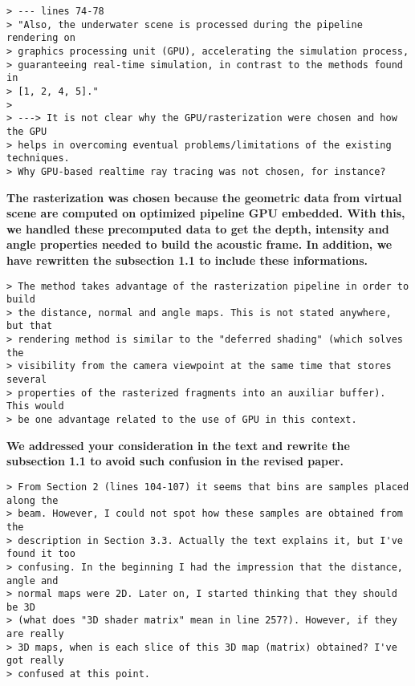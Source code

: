 \documentclass{article}
\begin{document}

\begin{verbatim}
> --- lines 74-78
> "Also, the underwater scene is processed during the pipeline rendering on
> graphics processing unit (GPU), accelerating the simulation process,
> guaranteeing real-time simulation, in contrast to the methods found in
> [1, 2, 4, 5]."
>
> ---> It is not clear why the GPU/rasterization were chosen and how the GPU
> helps in overcoming eventual problems/limitations of the existing techniques.
> Why GPU-based realtime ray tracing was not chosen, for instance?
\end{verbatim}

\textbf{The rasterization was chosen because the geometric data from virtual
scene are computed on optimized pipeline GPU embedded. With this, we handled
these precomputed data to get the depth, intensity and angle properties needed
to build the acoustic frame. In addition, we have rewritten the subsection 1.1
to include these informations.}

\begin{verbatim}
> The method takes advantage of the rasterization pipeline in order to build
> the distance, normal and angle maps. This is not stated anywhere, but that
> rendering method is similar to the "deferred shading" (which solves the
> visibility from the camera viewpoint at the same time that stores several
> properties of the rasterized fragments into an auxiliar buffer). This would
> be one advantage related to the use of GPU in this context.
\end{verbatim}

\textbf{We addressed your consideration in the text and rewrite the
subsection 1.1 to avoid such confusion in the revised paper.}

\begin{verbatim}
> From Section 2 (lines 104-107) it seems that bins are samples placed along the
> beam. However, I could not spot how these samples are obtained from the
> description in Section 3.3. Actually the text explains it, but I've found it too
> confusing. In the beginning I had the impression that the distance, angle and
> normal maps were 2D. Later on, I started thinking that they should be 3D
> (what does "3D shader matrix" mean in line 257?). However, if they are really
> 3D maps, when is each slice of this 3D map (matrix) obtained? I've got really
> confused at this point.
\end{verbatim}
\end{document}
